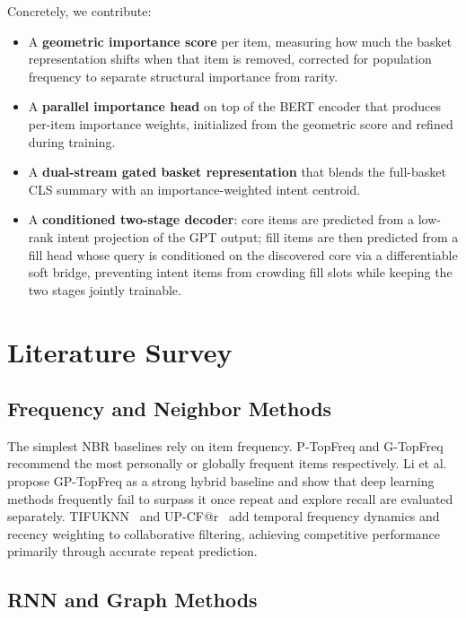 \documentclass[conference]{IEEEtran}
\begin{document}
Concretely, we contribute:
\begin{itemize}
\item A \textbf{geometric importance score} per item, measuring how much
  the basket representation shifts when that item is removed, corrected
  for population frequency to separate structural importance from rarity.
\item A \textbf{parallel importance head} on top of the BERT encoder
  that produces per-item importance weights, initialized from the
  geometric score and refined during training.
\item A \textbf{dual-stream gated basket representation} that blends the
  full-basket CLS summary with an importance-weighted intent centroid.
\item A \textbf{conditioned two-stage decoder}: core items are predicted
  from a low-rank intent projection of the GPT output; fill items are
  then predicted from a fill head whose query is conditioned on the
  discovered core via a differentiable soft bridge, preventing intent
  items from crowding fill slots while keeping the two stages jointly
  trainable.
\end{itemize}


\section{Literature Survey}
\label{sec:related}

\subsection{Frequency and Neighbor Methods}

The simplest NBR baselines rely on item frequency.
P-TopFreq and G-TopFreq recommend the most personally or globally
frequent items respectively. Li et al.\cite{li2023next} propose
GP-TopFreq as a strong hybrid baseline and show that deep learning
methods frequently fail to surpass it once repeat and explore recall are
evaluated separately. TIFUKNN~\cite{hu2020modeling} and
UP-CF@r~\cite{faggioli2020recency} add temporal frequency dynamics and
recency weighting to collaborative filtering, achieving competitive
performance primarily through accurate repeat prediction.

\subsection{RNN and Graph Methods}
\end{document}

